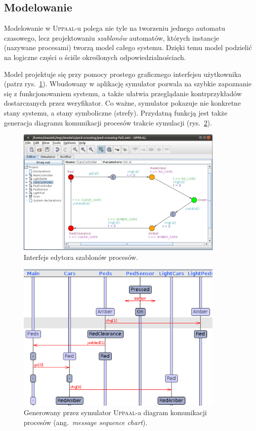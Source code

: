 \documentclass{pracamgr}
\newcommand{\ang}[1]{(ang.~\emph{#1})}
\newcommand{\upp}{\textsc{Uppaal}}
\theoremstyle{plain}
\begin{document}
\subsection{Modelowanie}
Modelowanie w \upp-u polega nie tyle na tworzeniu jednego automatu
czasowego, lecz projektowaniu \emph{szablonów} automatów, których
instancje (nazywane procesami) tworzą model całego systemu. Dzięki
temu model podzielić na logiczne części o ściśle określonych
odpowiedzialnościach.

Model projektuje się przy pomocy prostego graficznego interfejsu
użytkownika (patrz rys.~\ref{img:uppaal-gui}). Wbudowany w aplikację
symulator pozwala na szybkie zapoznanie się z funkcjonowaniem systemu,
a także ułatwia przeglądanie kontrprzykładów dostarczanych przez
weryfikator. Co ważne, symulator pokazuje nie konkretne stany systemu,
a stany symboliczne (strefy). Przydatną funkcją jest także generacja
diagramu komunikacji procesów trakcie symulacji
(rys.~\ref{img:uppaal-msc}).
\begin{figure}[ht]
  \centering
  \includegraphics[width=0.9\textwidth]{img/uppaal-editor.png}
  \caption{Interfejs edytora szablonów procesów.}
  \label{img:uppaal-gui}
\end{figure}

\begin{figure}[ht]
  \centering
  \includegraphics[width=0.9\textwidth]{img/uppaal-msc.png}
  \caption{Generowany przez symulator \upp-a diagram komunikacji
    procesów \ang{message sequence chart}.}
  \label{img:uppaal-msc}
\end{figure}
\end{document}
